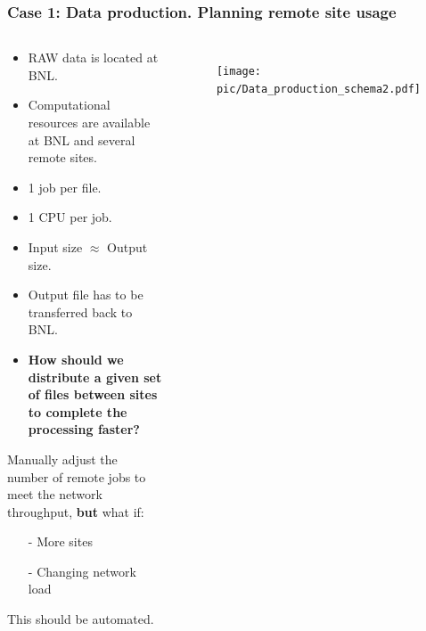 \documentclass{beamer}
\begin{document}
\begin{frame}\frametitle{Case 1: Data production. Planning remote site usage }
 	\begin{columns}[c] %
    \begin{footnotesize}
    \vspace{-11mm}
	\begin{block}{}
		\begin{itemize}
		\item RAW data is located at BNL.
		\item Computational resources are available at BNL and several remote sites.
		\item 1 job per file.
		\item 1 CPU per job. 
		\item Input size $\approx$ Output size.
		\item Output file has to be transferred back to BNL.
		\item \textbf{How should we distribute a given set of files between sites to complete the processing faster?}
		\end{itemize}
 	\end{block} 	
 	
 	\begin{block}{}
 	Manually adjust the number of remote jobs to meet the network throughput, \textbf{but} what if:
		\begin{itemize}
		\item[-] More sites
		\item[-] Changing network load
		\end{itemize}
	This should be automated.
 	\end{block}  	     

 	\end{footnotesize}
 		\vspace{-5mm}
		\begin{figure}   
				\texttt{[image: pic/Data\_production\_schema2.pdf]}
		\end{figure} 	 	
 	\end{columns}
\end{frame}
\end{document}
